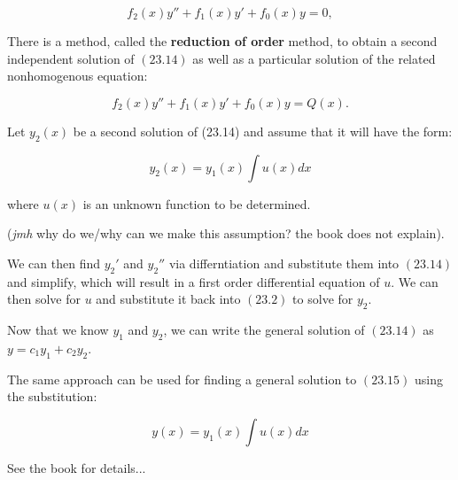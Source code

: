 \documentclass{article}
\begin{document}
\[ \tag{23.14} f_2(x)y'' + f_1(x)y' + f_0(x)y = 0, \]

There is a method, called the \textbf{reduction of order} method, to obtain a second independent solution of $(23.14)$ as well as a particular solution of the related nonhomogenous equation:

\[ \tag{23.15} f_2(x)y'' + f_1(x)y' + f_0(x)y = Q(x). \]

Let $y_2(x)$ be a second solution of (23.14) and assume that it will have the form:

\[ \tag{23.2} y_2(x) = y_1(x) \int{u(x)dx} \]

where $u(x)$ is an unknown function to be determined.

(\emph{jmh} why do we/why can we make this assumption? the book does not explain).

We can then find ${y_2}'$ and ${y_2}''$ via differntiation and substitute them into $(23.14)$ and simplify, which will result in a first order differential equation of $u$. We can then solve for $u$ and substitute it back into $(23.2)$ to solve for $y_2$.

Now that we know $y_1$ and $y_2$, we can write the general solution of $(23.14)$ as $y = c_1 y_1 + c_2 y_2 $.

The same approach can be used for finding a general solution to $(23.15)$ using the substitution:

\[ \tag{23.3} y(x) = y_1(x) \int{u(x)dx} \]

See the book for details...
\end{document}
